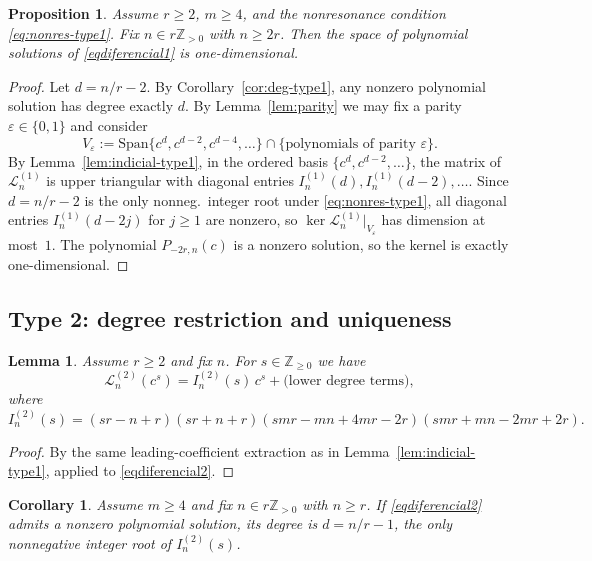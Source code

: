 \documentclass[final,nopreprintline]{elsarticle}
\newtheorem{corollary}[theorem]{Corollary}
\newtheorem{lemma}[theorem]{Lemma}
\newtheorem{proposition}[theorem]{Proposition}
\theoremstyle{definition}
\numberwithin{equation}{section}
\theoremstyle{remark}
\begin{document}
\begin{proposition}\label{prop:uniq-type1}
Assume $r\ge2$, $m\ge4$, and the nonresonance condition \eqref{eq:nonres-type1}.
Fix $n\in r\mathbb{Z}_{>0}$ with $n\ge2r$.
Then the space of polynomial solutions of \eqref{eqdiferencial1} is one-dimensional.
\end{proposition}

\begin{proof}
Let $d=n/r-2$. By Corollary~\ref{cor:deg-type1}, any nonzero polynomial solution has
degree exactly $d$. By Lemma~\ref{lem:parity} we may fix a parity $\varepsilon\in\{0,1\}$
and consider
\[
V_\varepsilon:=\mathrm{Span}\{c^{d},c^{d-2},c^{d-4},\dots\}\cap\{\text{polynomials of parity }\varepsilon\}.
\]
By Lemma~\ref{lem:indicial-type1}, in the ordered basis $\{c^d,c^{d-2},\ldots\}$, the
matrix of $\mathcal{L}^{(1)}_n$ is upper triangular with diagonal entries
$I^{(1)}_n(d),I^{(1)}_n(d-2),\ldots$. Since $d=n/r-2$ is the only nonneg.\ integer root
under \eqref{eq:nonres-type1}, all diagonal entries $I^{(1)}_n(d-2j)$ for $j\ge1$ are
nonzero, so $\ker\mathcal{L}^{(1)}_n|_{V_\varepsilon}$ has dimension at most~$1$.
The polynomial $P_{-2r,n}(c)$ is a nonzero solution, so the kernel is exactly
one-dimensional.
\end{proof}

\subsection{Type 2: degree restriction and uniqueness}

\begin{lemma}\label{lem:indicial-type2}
Assume $r\ge2$ and fix $n$.
For $s\in\mathbb{Z}_{\ge0}$ we have
\[
\mathcal{L}^{(2)}_n(c^s)=I^{(2)}_n(s)\,c^s+\text{(lower degree terms)},
\]
where
\begin{equation}\label{eq:I2}
I^{(2)}_n(s)
=(sr-n+r)(sr+n+r)(smr-mn+4mr-2r)(smr+mn-2mr+2r).
\end{equation}
\end{lemma}

\begin{proof}
By the same leading-coefficient extraction as in Lemma~\ref{lem:indicial-type1},
applied to \eqref{eqdiferencial2}.
\end{proof}

\begin{corollary}\label{cor:deg-type2}
Assume $m\ge4$ and fix $n\in r\mathbb{Z}_{>0}$ with $n\ge r$. If \eqref{eqdiferencial2}
admits a nonzero polynomial solution, its degree is $d=n/r-1$, the only nonnegative
integer root of $I^{(2)}_n(s)$.
\end{corollary}
\end{document}
